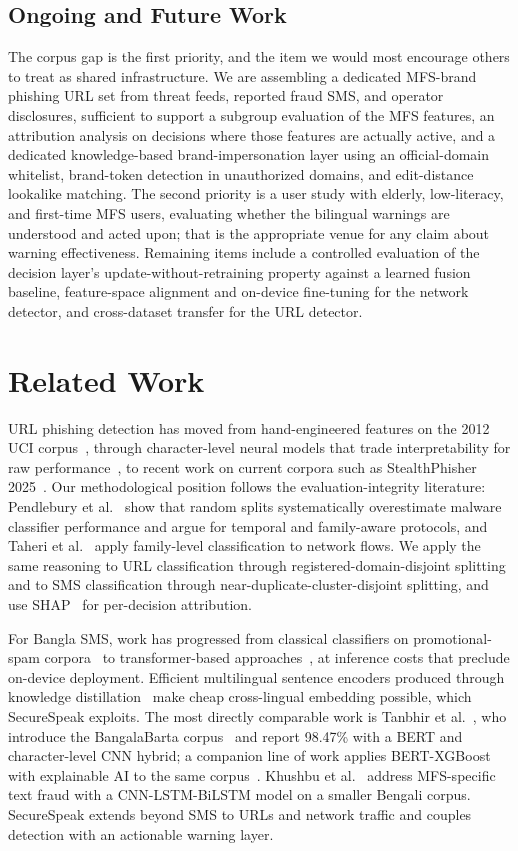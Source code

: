 \documentclass[preprint,12pt,number]{elsarticle}
\begin{document}
\subsection{Ongoing and Future Work}
The corpus gap is the first priority, and the item we would most encourage others to treat as shared infrastructure. We are assembling a dedicated MFS-brand phishing URL set from threat feeds, reported fraud SMS, and operator disclosures, sufficient to support a subgroup evaluation of the MFS features, an attribution analysis on decisions where those features are actually active, and a dedicated knowledge-based brand-impersonation layer using an official-domain whitelist, brand-token detection in unauthorized domains, and edit-distance lookalike matching. The second priority is a user study with elderly, low-literacy, and first-time MFS users, evaluating whether the bilingual warnings are understood and acted upon; that is the appropriate venue for any claim about warning effectiveness. Remaining items include a controlled evaluation of the decision layer's update-without-retraining property against a learned fusion baseline, feature-space alignment and on-device fine-tuning for the network detector, and cross-dataset transfer for the URL detector.

\section{Related Work}
URL phishing detection has moved from hand-engineered features on the 2012 UCI corpus~\cite{mohammad2014}, through character-level neural models that trade interpretability for raw performance~\cite{sahingoz2019}, to recent work on current corpora such as StealthPhisher 2025~\cite{stealthphisher}. Our methodological position follows the evaluation-integrity literature: Pendlebury et al.~\cite{pendlebury2019} show that random splits systematically overestimate malware classifier performance and argue for temporal and family-aware protocols, and Taheri et al.~\cite{taheri2019} apply family-level classification to network flows. We apply the same reasoning to URL classification through registered-domain-disjoint splitting and to SMS classification through near-duplicate-cluster-disjoint splitting, and use SHAP~\cite{lundberg2017} for per-decision attribution.

For Bangla SMS, work has progressed from classical classifiers on promotional-spam corpora~\cite{khan2023} to transformer-based approaches~\cite{foysal2025}, at inference costs that preclude on-device deployment. Efficient multilingual sentence encoders produced through knowledge distillation~\cite{reimers2020} make cheap cross-lingual embedding possible, which SecureSpeak exploits. The most directly comparable work is Tanbhir et al.~\cite{tanbhir2024}, who introduce the BangalaBarta corpus~\cite{bangalabarta} and report 98.47\% with a BERT and character-level CNN hybrid; a companion line of work applies BERT-XGBoost with explainable AI to the same corpus~\cite{nirapodbarta}. Khushbu et al.~\cite{khushbu2024} address MFS-specific text fraud with a CNN-LSTM-BiLSTM model on a smaller Bengali corpus. SecureSpeak extends beyond SMS to URLs and network traffic and couples detection with an actionable warning layer.
\end{document}
